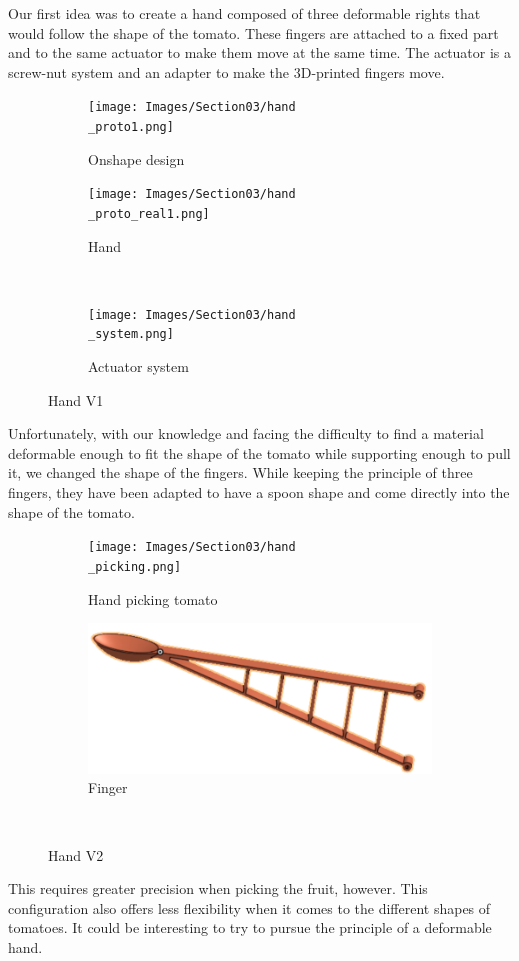 Our first idea was to create a hand composed of three deformable rights that would follow the shape of the tomato. These fingers are attached to a fixed part and to the same actuator to make them move at the same time. The actuator is a screw-nut system and an adapter to make the 3D-printed fingers move.
\begin{figure}[H]
    \begin{subfigure}{.5\linewidth}
        \centering
        \texttt{[image: Images/Section03/hand\\\_proto1.png]}
        \caption{Onshape design}
        \label{fig:HandProto1}
    \end{subfigure}%
    \begin{subfigure}{.5\linewidth}
        \centering
        \texttt{[image: Images/Section03/hand\\\_proto\_real1.png]}
        \caption{Hand}
        \label{fig:HProtoReal1}
    \end{subfigure}\\[1ex]
    \begin{subfigure}{\linewidth}
        \centering
        \texttt{[image: Images/Section03/hand\\\_system.png]}
        \caption{Actuator system}
        \label{fig:HSystem}
    \end{subfigure}
    \caption{Hand V1}
    \label{fig:HandV1}
\end{figure}

Unfortunately, with our knowledge and facing the difficulty to find a material deformable enough to fit the shape of the tomato while supporting enough to pull it, we changed the shape of the fingers. While keeping the principle of three fingers, they have been adapted to have a spoon shape and come directly into the shape of the tomato.
\begin{figure}[H]
    \begin{subfigure}{.5\linewidth}
        \centering
        \texttt{[image: Images/Section03/hand\\\_picking.png]}
        \caption{Hand picking tomato}
        \label{fig:HandPicking}
    \end{subfigure}%
    \begin{subfigure}{.5\linewidth}
        \centering
        \includegraphics[scale=0.5]{Images/Section03/finger1.png}
        \caption{Finger}
        \label{fig:Finger}
    \end{subfigure}\\[1ex]
    \caption{Hand V2}
    \label{fig:HandV2}
\end{figure}

This requires greater precision when picking the fruit, however. This configuration also offers less flexibility when it comes to the different shapes of tomatoes. It could be interesting to try to pursue the principle of a deformable hand. 